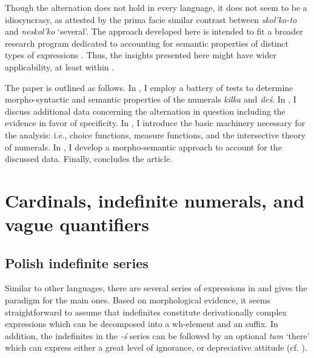 \documentclass[output=paper, newtxmath, colorlinks, citecolor=brown]{langsci/langscibook}
\begin{document}
	\noindent Though the alternation does not hold in every  language, it does not seem to be a  idiosyncrasy, as attested by the prima facie similar contrast between  \textit{skol'ko-to} and \textit{neskol'ko} `several'. The approach developed here is intended to fit a broader research program dedicated to accounting for semantic properties of distinct types of   expressions \citep{docekal2012atoms,docekal2013numerals,wagiel2014boys,wagiel2015sums,wagiel-toappear-entities,docekal_wagiel2018event}.  %
	Thus, the insights presented here might have wider applicability, at least within .

	The paper is outlined as follows. In , I employ a battery of tests to determine morpho-syntactic and semantic properties of the   numerals \textit{kilka} and \textit{ileś}. In , I discuss additional data concerning the alternation in question including the evidence in favor of specificity. In , I introduce the basic machinery necessary for the analysis: i.e., choice functions, measure functions, and the intersective theory of  numerals. In , I develop a morpho-semantic approach to account for the discussed data. Finally,  concludes the article.

	\section{Cardinals, indefinite numerals, and vague quantifiers}\label{sec:cardinals-indefinite-numerals-and-vague-quantifiers}

	\subsection{Polish indefinite series}\label{sec:polish-indefinite-series}

	Similar to other  languages, there are several series of  expressions in  and  gives the paradigm for the main ones. Based on morphological evidence, it seems straightforward to assume that  indefinites constitute derivationally complex expressions which can be decomposed into a wh-element and an  suffix. In addition, the indefinites in the \textit{-ś} series can be followed by an optional  \textit{tam} `there' which can express either a great level of ignorance, or depreciative attitude (cf. \citealt{bylinina2010depreciative}).
\end{document}
